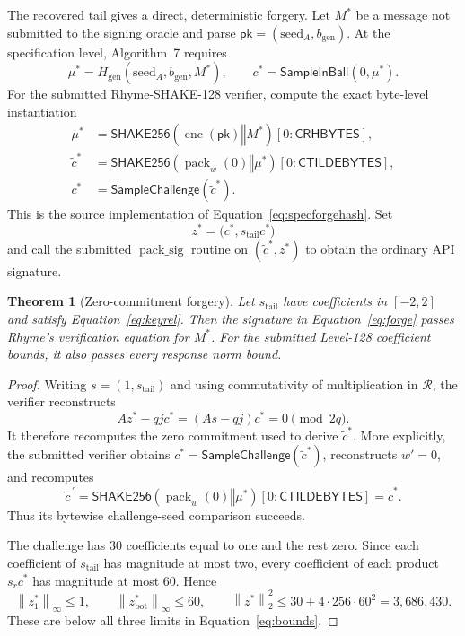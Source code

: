 \documentclass[11pt,a4paper]{article}
\newtheorem{theorem}{Theorem}
\newcommand{\R}{\mathcal{R}}
\newcommand{\SampleChallenge}{\mathsf{SampleChallenge}}
\newcommand{\SampleInBall}{\mathsf{SampleInBall}}
\newcommand{\SHAKE}{\mathsf{SHAKE256}}
\newcommand{\pk}{\mathsf{pk}}
\newcommand{\norm}[1]{\left\lVert #1\right\rVert}
\newcommand{\infnorm}[1]{\left\lVert #1\right\rVert_{\infty}}
\begin{document}
The recovered tail gives a direct, deterministic forgery.  Let $M^*$ be a
message not submitted to the signing oracle and parse
$\pk=(\mathrm{seed}_A,b_{\mathrm{gen}})$.  At the specification level,
Algorithm~7 requires
\begin{equation}
 \mu^*=H_{\mathrm{gen}}(\mathrm{seed}_A,b_{\mathrm{gen}},M^*),\qquad
 c^*=\SampleInBall(0,\mu^*).                         \label{eq:specforgehash}
\end{equation}
For the submitted Rhyme-SHAKE-128 verifier, compute the exact byte-level
instantiation
\begin{align}
 \mu^*&=\SHAKE(\operatorname{enc}(\pk)\mathbin\Vert M^*)
                    [0\mathbin{:}\mathsf{CRHBYTES}],\nonumber\\
 \widetilde c^*&=\SHAKE(\operatorname{pack}_w(0)\mathbin\Vert\mu^*)
                    [0\mathbin{:}\mathsf{CTILDEBYTES}],\nonumber\\
 c^*&=\SampleChallenge(\widetilde c^*).              \label{eq:sourceforgehash}
\end{align}
This is the source implementation of
Equation~\eqref{eq:specforgehash}.  Set
\begin{equation}
             z^*=\bigl(c^*,s_{\mathrm{tail}}c^*\bigr)  \label{eq:forge}
\end{equation}
and call the submitted $\operatorname{pack\_sig}$ routine on
$(\widetilde c^*,z^*)$ to obtain the ordinary API signature.

\begin{theorem}[Zero-commitment forgery]
\label{thm:forge}
Let $s_{\mathrm{tail}}$ have coefficients in $[-2,2]$ and satisfy
Equation~\eqref{eq:keyrel}.  Then the signature in
Equation~\eqref{eq:forge} passes Rhyme's verification equation for $M^*$.
For the submitted Level-128 coefficient bounds, it also passes every response
norm bound.
\end{theorem}

\begin{proof}
Writing $s=(1,s_{\mathrm{tail}})$ and using commutativity of multiplication in
$\R$, the verifier reconstructs
\[
 Az^*-qjc^*=(As-qj)c^*=0\pmod {2q}.
\]
It therefore recomputes the zero commitment used to derive
$\widetilde c^*$.  More explicitly, the submitted verifier obtains
$c^*=\SampleChallenge(\widetilde c^*)$, reconstructs $w'=0$, and recomputes
\[
 \widetilde c^{\,\prime}=\SHAKE(\operatorname{pack}_w(0)\mathbin\Vert\mu^*)
                    [0\mathbin{:}\mathsf{CTILDEBYTES}]=\widetilde c^*.
\]
Thus its bytewise challenge-seed comparison succeeds.

The challenge has 30 coefficients equal to one and the rest zero.  Since
each coefficient of $s_{\mathrm{tail}}$ has magnitude at most two, every
coefficient of each product $s_rc^*$ has magnitude at most $60$.  Hence
\[
 \infnorm{z_1^*}\le1,\qquad
 \infnorm{z_{\mathrm{bot}}^*}\le60,\qquad
 \norm{z^*}_2^2\le30+4\cdot256\cdot60^2=3{,}686{,}430.
\]
These are below all three limits in Equation~\eqref{eq:bounds}.
\end{proof}
\end{document}
